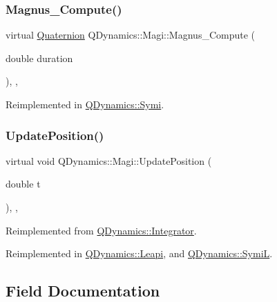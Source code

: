\subsubsection{\texorpdfstring{Magnus\+\_\+\+Compute()}{Magnus\_Compute()}}
{\footnotesize\ttfamily virtual \hyperlink{classQDynamics_1_1Quaternion}{Quaternion} Q\+Dynamics\+::\+Magi\+::\+Magnus\+\_\+\+Compute (\begin{DoxyParamCaption}\item[{double}]{duration }\end{DoxyParamCaption})\hspace{0.3cm}{\ttfamily [inline]}, {\ttfamily [protected]}, {\ttfamily [virtual]}}



Reimplemented in \hyperlink{classQDynamics_1_1Symi_a4cea691ad899227f92004dd666180415}{Q\+Dynamics\+::\+Symi}.

\mbox{\label{classQDynamics_1_1Magi_a500467f899244edfae15f34c84c7684c}} 
\subsubsection{\texorpdfstring{Update\+Position()}{UpdatePosition()}}
{\footnotesize\ttfamily virtual void Q\+Dynamics\+::\+Magi\+::\+Update\+Position (\begin{DoxyParamCaption}\item[{double}]{t }\end{DoxyParamCaption})\hspace{0.3cm}{\ttfamily [inline]}, {\ttfamily [protected]}, {\ttfamily [virtual]}}



Reimplemented from \hyperlink{classQDynamics_1_1Integrator_a4effa27d56f3205e53653b1fdc5cd08e}{Q\+Dynamics\+::\+Integrator}.



Reimplemented in \hyperlink{classQDynamics_1_1Leapi_ada2b4935513fa7e0cb4f78ade9f2fd0e}{Q\+Dynamics\+::\+Leapi}, and \hyperlink{classQDynamics_1_1SymiL_a28d23793abeb8f40c9d9ec069d67debb}{Q\+Dynamics\+::\+SymiL}.



\subsection{Field Documentation}
\mbox{\label{classQDynamics_1_1Magi_ac9ff1c2f4ea0dcc30f1ee52b0894c9e9}} 

